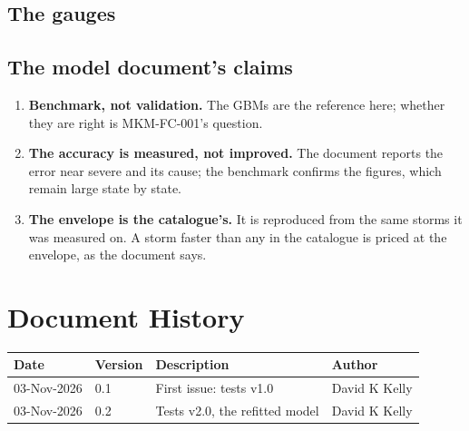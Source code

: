 \documentclass[11pt,a4paper]{article}
\renewcommand{\mkmhistorypage}[1]{%
    \section{Document History}
    \begin{table}[ht]
        \centering
        \begin{tabular}{l|l|p{9cm}|l}
            \textbf{Date} & \textbf{Version} & \textbf{Description} & \textbf{Author} \\
            \hline
            #1
        \end{tabular}
    \end{table}
}
\begin{document}
\mkmvalidation



\subsection{The gauges}


\subsection{The model document's claims}


\mkmlimitations

\begin{enumerate}[leftmargin=*]
\item \textbf{Benchmark, not validation.} The GBMs are the reference here; whether they
  are right is MKM-FC-001's question.
\item \textbf{The accuracy is measured, not improved.} The document reports the error
  near severe and its cause; the benchmark confirms the figures, which remain large
  state by state.
\item \textbf{The envelope is the catalogue's.} It is reproduced from the same storms it
  was measured on. A storm faster than any in the catalogue is priced at the envelope,
  as the document says.
\end{enumerate}

\mkmhistorypage{03-Nov-2026 & 0.1 & First issue: tests v1.0 & David K Kelly \\
03-Nov-2026 & 0.2 & Tests v2.0, the refitted model & David K Kelly \\}
\end{document}
